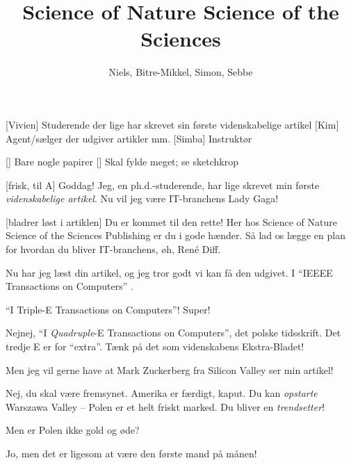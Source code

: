 \documentclass[a4paper,11pt]{article}
\title{Science of Nature Science of the Sciences}
\author{Niels, Bitre-Mikkel, Simon, Sebbe}
\begin{document}
\maketitle

\begin{roles}
[Vivien] Studerende der lige har skrevet sin første videnskabelige artikel
[Kim] Agent/sælger der udgiver artikler mm.
[Simba] Instruktør
\end{roles}

\begin{props}
[] Bare nogle papirer
[] Skal fylde meget; se sketchkrop
\end{props}


\begin{sketch}



[frisk, til A] Goddag!  Jeg, en ph.d.-studerende, har lige skrevet min
første \emph{videnskabelige artikel}.  Nu vil jeg være IT-branchens Lady Gaga!


[bladrer løst i artiklen] Du er kommet til den rette!  Her hos Science
of Nature Science of the Sciences Publishing er du i gode hænder.  Så lad os
lægge en plan for hvordan du bliver IT-branchens, øh, René Diff.

 Nu har jeg læst din artikel, og jeg tror godt vi kan få den udgivet.  I
``IEEEE Transactions on Computers'' .

 ``I Triple-E Transactions on Computers''!  Super!

 Nejnej, ``I \emph{Quadruple}-E Transactions on Computers'', det polske
tidsskrift.  Det tredje E er for ``extra''.  Tænk på det som videnskabens
Ekstra-Bladet!

 Men jeg vil gerne have at Mark Zuckerberg fra Silicon Valley ser min
artikel!

 Nej, du skal være fremsynet.  Amerika er færdigt, kaput.  Du kan
\emph{opstarte} Warszawa Valley -- Polen er et helt friskt marked.  Du bliver en
\emph{trendsetter}!

 Men er Polen ikke gold og øde?

 Jo, men det er ligesom at være den første mand på månen!


\end{sketch}
\end{document}
